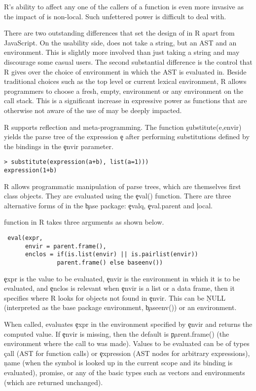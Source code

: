 \documentclass[USenglish,cleveref, autoref, thm-restate]{lipics-v2019}
\begin{document}
R's ability to affect any one of the callers of a function is even
more invasive as the impact of \eval is non-local. Such unfettered
power is difficult to deal with.



There are two outstanding differences that set the design of \eval in
R apart from JavaScript. On the usability side, \eval does not take a
string, but an AST and an environment. This is slightly more involved
than just taking a string and may discourage some casual users. The
second substantial difference is the control that R gives over the
choice of environment in which the AST is evaluated in. Beside
traditional choices such as the top level or current lexical
environment, R allows programmers to choose a fresh, empty,
environment or any environment on the call stack. This is a
significant increase in expressive power as functions that are
otherwise not aware of the use of \eval may be deeply impacted.




R supports reflection and meta-programming. The function
\c{substitute(e,envir)} yields the parse tree of the expression \c{e}
after performing substitutions defined by the bindings in the
\c{envir} parameter.

\begin{lstlisting}
> substitute(expression(a+b), list(a=1)))
expression(1+b)
\end{lstlisting}

\noindent
R allows programmatic manipulation of parse trees, which are themselves
first class objects. They are evaluated using the \c{eval()}
function. There are three alternative forms  of \eval in the \c{base} package:
\c{evalq}, \c{eval.parent} and \c{local}.

\eval function in R takes three arguments as shown below.
\begin{lstlisting}
 eval(expr,
      envir = parent.frame(),
      enclos = if(is.list(envir) || is.pairlist(envir))
               parent.frame() else baseenv())
\end{lstlisting}

\c{expr} is the value to be evaluated, \c{envir}
is the environment in which it is to be evaluated, and \c{enclos} is
relevant when \c{envir} is a list or a data frame, then it specifies where R
looks for objects not found in \c{envir}. This can be \c{NULL} (interpreted
as the base package environment, \c{baseenv()}) or an environment.

When called, \eval evaluates \c{expr} in the environment specified by
\c{envir} and returns the computed value. If \c{envir} is missing, then the
default is \c{parent.frame()} (the environment where the call to \eval was
made).  Values to be evaluated can be of types \c{call} (AST for function
calls) or \c{expression} (AST nodes for arbitrary expressions), \c{name}
(when the symbol is looked up in the current scope and its binding is
evaluated), promise, or any of the basic types such as vectors and
environments (which are returned unchanged).
\end{document}
